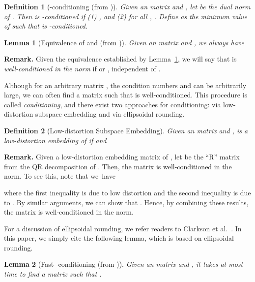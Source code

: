 \documentclass[11pt]{article}
\newtheorem{definition}{Definition}
\newtheorem{lemma}{Lemma}
\begin{document}
\begin{definition}[-conditioning (from \cite{DDHKM09_lp_SICOMP})]
\label{def:lpbasis}
  Given an  matrix  and , let  be the dual
  norm of .
  Then  is \emph{-conditioned} if (1) ,
  and (2) for all , .
  Define  as the minimum value of  such that
   is -conditioned. 
\end{definition}

\begin{lemma}[Equivalence of  and  (from
  \cite{CDMMMW13_SODA})]
  \label{lemma:kappa_equiv}
  Given an  matrix  and , we always have
  
\end{lemma}

\noindent
\textbf{Remark.}
Given the equivalence established by Lemma~\ref{lemma:kappa_equiv}, we will say
that  is \emph{well-conditioned in the  norm} if  or
, independent of . 

Although for an arbitrary matrix , the condition numbers
 and  can be arbitrarily large, we can often
find a matrix  such that  is well-conditioned. 
This procedure is called \emph{conditioning}, and there exist two approaches for
conditioning: via low-distortion  subspace embedding and via ellipsoidal
rounding.

\begin{definition}[Low-distortion  Subspace Embedding]
  Given an  matrix  and ,  is a low-distortion embedding of  if 
  and
  
\end{definition}

\noindent
\textbf{Remark.}
Given a low-distortion embedding matrix  of , let  be the ``R''
matrix from the QR decomposition of . 
Then, the matrix  is well-conditioned in the  norm. 
To see this, note that we~have

where the first inequality is due to low distortion and the second inequality is
due to . 
By similar arguments, we can show that . 
Hence, by combining these results, the matrix  is well-conditioned in
the  norm. 

For a discussion of ellipsoidal rounding, we refer readers to Clarkson et
al.~\cite{CDMMMW13_SODA}. 
In this paper, we simply cite the following lemma, which is based on ellipsoidal
rounding.

\begin{lemma}[Fast -conditioning (from \cite{CDMMMW13_SODA})]
  \label{lemma:lp_cond_2d}
  Given an  matrix  and , it takes at most
   time to find a matrix  such that
  .
\end{lemma}
\end{document}
